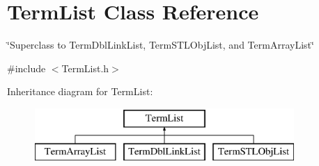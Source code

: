 \hypertarget{classTermList}{\section{Term\-List Class Reference}
\label{classTermList}
}


\char`\"{}\-Superclass to Term\-Dbl\-Link\-List, Term\-S\-T\-L\-Obj\-List, and Term\-Array\-List\char`\"{}  




{\ttfamily \#include $<$Term\-List.\-h$>$}

Inheritance diagram for Term\-List\-:\begin{figure}[H]
\begin{center}
\leavevmode
\includegraphics[height=2.000000cm]{classTermList}
\end{center}
\end{figure}
